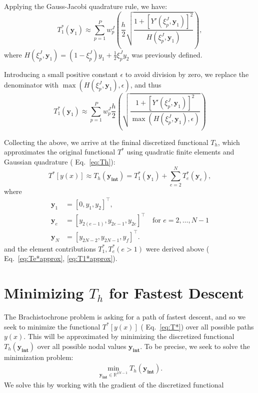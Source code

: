 \documentclass[11pt]{article}
\begin{document}
Applying the Gauss-Jacobi quadrature rule, we have:
\[ 
    T_1^*(\mathbf{y}_1) \approx \sum_{p=1}^{P} w_{p}^{J} \left( \frac{h}{2}  \sqrt{\frac{1 + [Y'(\xi_{p}^{J}, \mathbf{y}_1)]^2}{H(\xi_{p}^{J}, \mathbf{y}_1)}} \right),
\] where \( H(\xi_{p}^{J}, \mathbf{y}_1) = (1-\xi_{p}^{J})y_1 + \frac{1}{2}\xi_{p}^{J} y_2 \) was previously defined. 

Introducing a small positive constant \( \epsilon \) to avoid division by zero, we replace the denominator with \( \max(H(\xi_{p}^{J}, \mathbf{y}_1), \epsilon) \), and thus  
\begin{equation}
    T_1^*(\mathbf{y}_1) \approx \sum_{p=1}^{P} w_{p}^{J}  \frac{h}{2} \left( \sqrt{\frac{1 + [Y'(\xi_{p}^{J}, \mathbf{y}_1)]^2}{ \max(H(\xi_{p}^{J}, \mathbf{y}_1), \epsilon) }} \right) \label{eq:T1*approx}
\end{equation}

Collecting the above, we arrive at the fininal discretized functional \( T_h \), which approximates the original functional \( T^{*}  \) using quadratic finite elements and Gaussian quadrature ( Eq.~\eqref{eq:Th}):
\begin{equation} 
    T^*[y(x)] \approx  T_h(\mathbf{y_\text{int}}) = T_1^*(\mathbf{y}_1) + \sum_{e=2}^{N} T_e^*(\mathbf{y}_e), \label{eq:T*approx}
\end{equation}
where  
\begin{align*}
    \mathbf{y}_1 &= [0, y_1, y_2]^\top, \\ 
    \mathbf{y}_e &= [y_{2(e-1)}, y_{2e-1}, y_{2e}]^\top \quad \text{for } e = 2, \ldots, N-1 \\ 
    \mathbf{y}_N &= [y_{2N-2}, y_{2N-1}, y_f]^\top.
\end{align*}
and the element contributions \( T^{*}_1 , T^*_e ( e >1)  \) were derived above ( Eq.~\eqref{eq:Te*approx}, \eqref{eq:T1*approx}). 


\section{Minimizing $ T_h $ for Fastest Descent}
The Brachistochrone problem is asking for a path of fastest descent, and so we seek to minimize the functional \( T^*[y(x)] \) ( Eq.~\eqref{eq:T*}) over all possible paths \( y(x) \). This will be approximated by minimizing the discretized functional \( T_h(\mathbf{y_\text{int}}) \) over all possible nodal values \( \mathbf{y_\text{int}} \). To be precise, we seek to solve the minimization problem:
\begin{align} 
     \min_{\mathbf{y_\text{int}} \in \mathbb{R}^{2N-1}} T_h(\mathbf{y_\text{int}}). \label{eq:minT}
\end{align}
We solve this by working with the gradient of the discretized functional 
 
\end{document}
